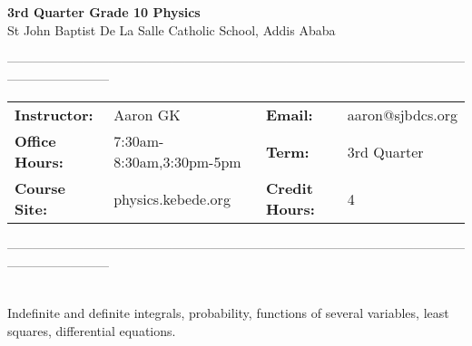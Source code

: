 \documentclass[11pt]{article}
\begin{document}
	\begin{center}
		\textbf{\Large 3rd Quarter Grade 10 Physics}\\
		St John Baptist De La Salle Catholic School, Addis Ababa\\ 
	\end{center}
	
------------------------------------------------------------------------------------------------------------------------------------
\vspace{-.1in}
\begin{center}
	\begin{tabular}{llll}
		\textbf{Instructor:} & \footnotesize{Aaron GK}  &   \textbf{Email:} & \footnotesize{aaron@sjbdcs.org} \\ 
		\textbf{Office Hours:} & \footnotesize{7:30am-8:30am,3:30pm-5pm}   & \textbf{Term:}  & \footnotesize{3rd Quarter}  \\
		\textbf{Course Site:} & \footnotesize{physics.kebede.org}   & \textbf{Credit Hours:} & 4\\
	\end{tabular}
\end{center}

------------------------------------------------------------------------------------------------------------------------------------

\\
Indefinite and definite integrals, probability, functions of several variables, least squares, differential equations.
\end{document}
